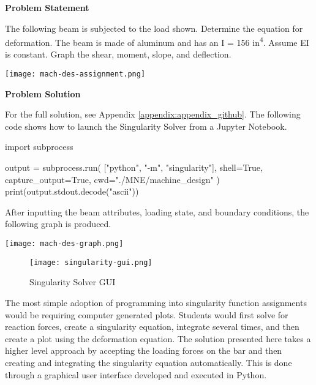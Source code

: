 \begin{tcolorbox}[breakable, enhanced jigsaw, title=ME 533: Assignment \ref{mach_des_assignment_1}, 
    colframe=ksu-purple, colback=ksu-gray]

    \textbf{Problem Statement}
    \parindent15pt

    The following beam is subjected to the load shown. Determine the equation for deformation. 
    The beam is made of aluminum and has an I = 156 in\textsuperscript{4}. Assume EI is constant. Graph 
    the shear, moment, slope, and deflection.

    \begin{center}
        \texttt{[image: mach-des-assignment.png]}
    \end{center}

    \tcblower
    \textbf{Problem Solution}
    \parindent15pt

    For the full solution, see Appendix \ref{appendix:appendix_github}. The following code shows how to
    launch the Singularity Solver from a Jupyter Notebook.

\begin{python}
import subprocess

output = subprocess.run(
    ["python", "-m", "singularity"], 
    shell=True, 
    capture_output=True,
    cwd="./MNE/machine_design"
)
print(output.stdout.decode("ascii"))
\end{python}

After inputting the beam attributes, loading state, and boundary conditions, the following graph
is produced.

\begin{center}
    \texttt{[image: mach-des-graph.png]}
\end{center}
\end{tcolorbox}

\begin{figure}[h]
    \texttt{[image: singularity-gui.png]}
    \centering
    \caption{Singularity Solver GUI}
    \centering
    \label{fig:singularity-gui}
\end{figure}

The most simple adoption of programming into singularity function assignments would be requiring computer
generated plots. Students would first solve for reaction forces, create a singularity equation, integrate
several times, and then create a plot using the deformation equation. The solution presented here takes a 
higher level approach by accepting the loading forces on the bar and then creating and integrating the 
singularity equation automatically. This is done through a graphical user interface developed and executed
in Python.

